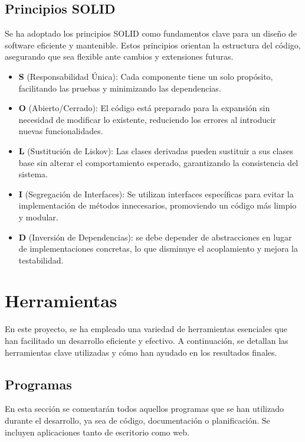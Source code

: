 \subsection{Principios SOLID}
Se ha adoptado los principios SOLID como fundamentos clave para un diseño de software eficiente y mantenible. Estos principios orientan la estructura del código, asegurando que sea flexible ante cambios y extensiones futuras. 
\begin{mdframed}[linewidth=1pt, linecolor=black, leftmargin=10, rightmargin=10, backgroundcolor=gray!10, roundcorner=30pt]
		\begin{itemize}
		\item \textbf{S} (Responsabilidad Única): Cada componente tiene un solo propósito, facilitando las pruebas y minimizando las dependencias.
		\item \textbf{O} (Abierto/Cerrado): El código está preparado para la expansión sin necesidad de modificar lo existente, reduciendo los errores al introducir nuevas funcionalidades.
		\item \textbf{L} (Sustitución de Liskov): Las clases derivadas pueden sustituir a sus clases base sin alterar el comportamiento esperado, garantizando la consistencia del sistema.
		\item \textbf{I} (Segregación de Interfaces): Se utilizan interfaces específicas para evitar la implementación de métodos innecesarios, promoviendo un código más limpio y modular.
		\item \textbf{D} (Inversión de Dependencias): se debe depender de abstracciones en lugar de implementaciones concretas, lo que disminuye el acoplamiento y mejora la testabilidad.
	\end{itemize}
\end{mdframed}

\section{Herramientas}
En este proyecto, se ha empleado una variedad de herramientas esenciales que han facilitado un desarrollo eficiente y efectivo. A continuación, se detallan las herramientas clave utilizadas y cómo han ayudado en los resultados finales.
\subsection{Programas}
En esta sección se comentarán todos aquellos programas que se han utilizado durante el desarrollo, ya sea de código, documentación o planificación. Se incluyen aplicaciones tanto de escritorio como web.


